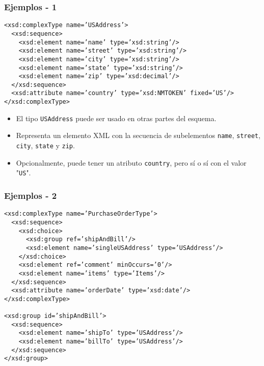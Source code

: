 \begin{frame}
\frametitle{Ejemplos - 1}
\footnotesize
\texttt{<xsd:complexType name='USAddress'>				\\
	~~<xsd:sequence>						\\
	~~~~<xsd:element name='name'   type='xsd:string'/>		\\
	~~~~<xsd:element name='street' type='xsd:string'/>		\\
	~~~~<xsd:element name='city'   type='xsd:string'/>		\\
	~~~~<xsd:element name='state'  type='xsd:string'/>		\\
	~~~~<xsd:element name='zip'    type='xsd:decimal'/>		\\
	~~</xsd:sequence>						\\
	~~<xsd:attribute name='country' type='xsd:NMTOKEN' fixed='US'/>	\\
	</xsd:complexType>
}

\pause

\begin{itemize}
\item	El tipo \texttt{USAddress} puede ser usado en otras partes del
	esquema.
	\pause

\item	Representa un elemento XML con la secuencia de subelementos
	\texttt{name}, \texttt{street}, \texttt{city}, \texttt{state} y
	\texttt{zip}.
	\pause

\item	Opcionalmente, puede tener un atributo \texttt{country}, pero sí o sí
	con el valor "\texttt{US}".
\end{itemize}

\end{frame}

\begin{frame}
\frametitle{Ejemplos - 2}
\footnotesize
\texttt{<xsd:complexType name='PurchaseOrderType'>			\\
	~~<xsd:sequence>						\\
	~~~~<xsd:choice>						\\
	~~~~~~<xsd:group   ref='shipAndBill'/>				\\
	~~~~~~<xsd:element name='singleUSAddress' type='USAddress'/>	\\
	~~~~</xsd:choice>						\\
	~~~~<xsd:element ref='comment' minOccurs='0'/>			\\
	~~~~<xsd:element name='items'  type='Items'/>			\\
	~~</xsd:sequence>						\\
	~~<xsd:attribute name='orderDate' type='xsd:date'/>		\\
	</xsd:complexType>						\\
	~								\\
	<xsd:group id='shipAndBill'>					\\
	~~<xsd:sequence>						\\
	~~~~<xsd:element name='shipTo' type='USAddress'/>		\\
	~~~~<xsd:element name='billTo' type='USAddress'/>		\\
	~~</xsd:sequence>						\\
	</xsd:group>
}

\end{frame}
